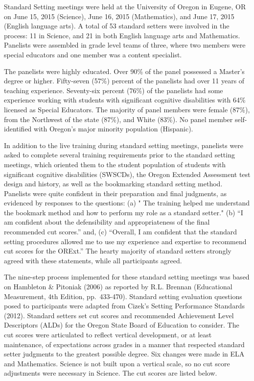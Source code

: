 \documentclass[]{article}
\begin{document}
Standard Setting meetings were held at the University of Oregon in
Eugene, OR on June 15, 2015 (Science), June 16, 2015 (Mathematics), and
June 17, 2015 (English language arts). A total of 53 standard setters
were involved in the process: 11 in Science, and 21 in both English
language arts and Mathematics. Panelists were assembled in grade level
teams of three, where two members were special educators and one member
was a content specialist.

The panelists were highly educated. Over 90\% of the panel possessed a
Master's degree or higher. Fifty-seven (57\%) percent of the panelists
had over 11 years of teaching experience. Seventy-six percent (76\%) of
the panelists had some experience working with students with significant
cognitive disabilities with 64\% licensed as Special Educators. The
majority of panel members were female (87\%), from the Northwest of the
state (87\%), and White (83\%). No panel member self-identified with
Oregon's major minority population (Hispanic).

In addition to the live training during standard setting meetings,
panelists were asked to complete several training requirements prior to
the standard setting meetings, which oriented them to the student
population of students with significant cognitive disabilities (SWSCDs),
the Oregon Extended Assessment test design and history, as well as the
bookmarking standard setting method. Panelists were quite confident in
their preparation and final judgments, as evidenced by responses to the
questions: (a) " The training helped me understand the bookmark method
and how to perform my role as a standard setter." (b) ``I am confident
about the defensibility and appropriateness of the final recommended cut
scores.'' and, (c) ``Overall, I am confident that the standard setting
procedures allowed me to use my experience and expertise to recommend
cut scores for the ORExt.'' The hearty majority of standard setters
strongly agreed with these statements, while all participants agreed.

The nine-step process implemented for these standard setting meetings
was based on Hambleton \& Pitoniak (2006) as reported by R.L. Brennan
(Educational Measurement, 4th Edition, pp.~433-470). Standard setting
evaluation questions posed to participants were adapted from Cizek's
Setting Performance Standards (2012). Standard setters set cut scores
and recommended Achievement Level Descriptors (ALDs) for the Oregon
State Board of Education to consider. The cut scores were articulated to
reflect vertical development, or at least maintenance, of expectations
across grades in a manner that respected standard setter judgments to
the greatest possible degree. Six changes were made in ELA and
Mathematics. Science is not built upon a vertical scale, so no cut score
adjustments were necessary in Science. The cut scores are listed below.
\end{document}

